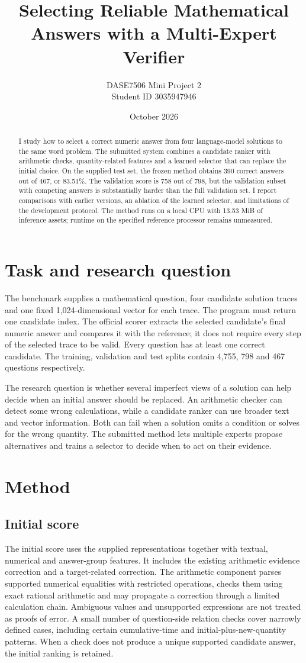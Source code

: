 \documentclass[10pt]{article}
\title{Selecting Reliable Mathematical Answers with a Multi-Expert Verifier}
\author{DASE7506 Mini Project 2\\ Student ID 3035947946}
\date{October 2026}
\begin{document}
\maketitle
\begin{abstract}
I study how to select a correct numeric answer from four language-model solutions to the same word problem. The submitted system combines a candidate ranker with arithmetic checks, quantity-related features and a learned selector that can replace the initial choice. On the supplied test set, the frozen method obtains 390 correct answers out of 467, or 83.51\%. The validation score is 758 out of 798, but the validation subset with competing answers is substantially harder than the full validation set. I report comparisons with earlier versions, an ablation of the learned selector, and limitations of the development protocol. The method runs on a local CPU with 13.53 MiB of inference assets; runtime on the specified reference processor remains unmeasured.
\end{abstract}
\section{Task and research question}
The benchmark supplies a mathematical question, four candidate solution traces and one fixed 1,024-dimensional vector for each trace. The program must return one candidate index. The official scorer extracts the selected candidate's final numeric answer and compares it with the reference; it does not require every step of the selected trace to be valid. Every question has at least one correct candidate. The training, validation and test splits contain 4,755, 798 and 467 questions respectively.

The research question is whether several imperfect views of a solution can help decide when an initial answer should be replaced. An arithmetic checker can detect some wrong calculations, while a candidate ranker can use broader text and vector information. Both can fail when a solution omits a condition or solves for the wrong quantity. The submitted method lets multiple experts propose alternatives and trains a selector to decide when to act on their evidence.
\section{Method}
\subsection{Initial score}
The initial score uses the supplied representations together with textual, numerical and answer-group features. It includes the existing arithmetic evidence correction and a target-related correction. The arithmetic component parses supported numerical equalities with restricted operations, checks them using exact rational arithmetic and may propagate a correction through a limited calculation chain. Ambiguous values and unsupported expressions are not treated as proofs of error. A small number of question-side relation checks cover narrowly defined cases, including certain cumulative-time and initial-plus-new-quantity patterns. When a check does not produce a unique supported candidate answer, the initial ranking is retained.
\end{document}
